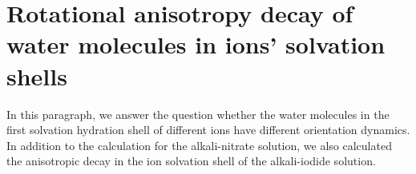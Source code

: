 
\FloatBarrier
\section{Rotational anisotropy decay of water molecules in ions' solvation shells}\label{RAD_SHELL}
In this paragraph, we answer the question whether the water molecules in the first solvation hydration shell of different ions have different orientation dynamics. 
In addition to the calculation for the alkali-nitrate solution, we also calculated the anisotropic decay in the ion solvation shell of the alkali-iodide solution.

